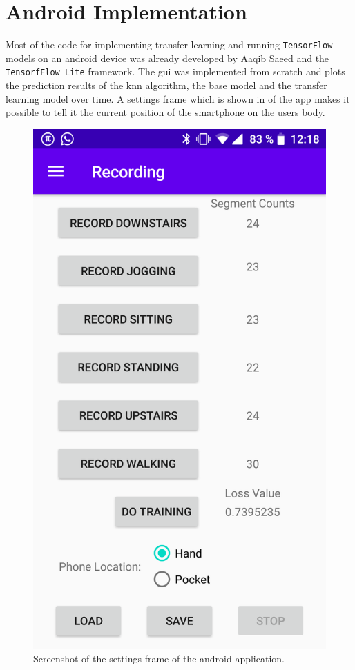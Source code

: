 \section{Android Implementation}
\label{sec:android}
Most of the code for implementing transfer learning and running \texttt{TensorFlow} models on an android device was already developed by Aaqib Saeed\autocite{saeed:transferLearning} and the \texttt{TensorfFlow Lite} framework. The \gls{gui} was implemented from scratch and plots the prediction results of the \gls{knn} algorithm, the base model and the transfer learning model over time.
A settings frame which is shown in  of the app makes it possible to tell it the current position of the smartphone on the users body.
\begin{figure}[htpb]
\centering
\includegraphics[width=\linewidth]{settingsFrame}
\caption{Screenshot of the settings frame of the android application.}
\label{myfig:settings}
\end{figure}


